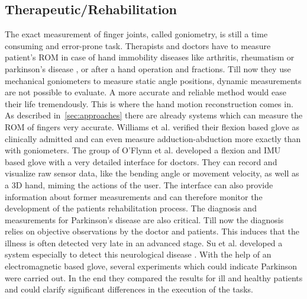 \subsection{Therapeutic/Rehabilitation} \label{subsec:applications:reha}
The exact measurement of finger joints, called goniometry, is still a time consuming and error-prone task. Therapists and doctors have to measure patient's \ac{ROM} in case of hand immobility diseases like arthritis, rheumatism \cite{o2013novel} or parkinson's disease \cite{su20033}, or after a hand operation and fractions. Till now they use mechanical goniometers \cite{williams2000goniometric} to measure static angle positions, dynamic measurements are not possible to evaluate. A more accurate and reliable method would ease their life tremendously. This is where the hand motion reconstruction comes in. As described in~\ref{sec:approaches} there are already systems which can measure the \ac{ROM} of fingers very accurate. Williams et al. verified their flexion based glove as clinically admitted and can even measure adduction-abduction more exactly than with goniometers. The group of O'Flynn et al. developed a flexion and \ac{IMU} based glove with a very detailed interface for doctors. They can record and visualize raw sensor data, like the bending angle or movement velocity, as well as a 3D hand, miming the actions of the user. The interface can also provide information about former measurements and can therefore monitor the development of the patients rehabilitation process. The diagnosis and measurements for Parkinson's disease are also critical. Till now the diagnosis relies on objective observations by the doctor and patients. This induces that the illness is often detected very late in an advanced stage. Su et al. developed a system especially to detect this neurological disease \cite{su20033}. With the help of an electromagnetic based glove, several experiments which could indicate Parkinson were carried out. In the end they compared the results for ill and healthy patients and could clarify significant differences in the execution of the tasks.\\

